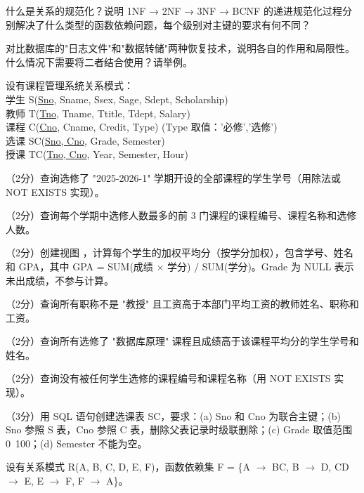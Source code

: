 \documentclass[a4paper,11pt]{article}
\begin{document}

\q 什么是关系的规范化？说明 1NF → 2NF → 3NF → BCNF 的递进规范化过程分别解决了什么类型的函数依赖问题，每个级别对主键的要求有何不同？
\anslines{3cm}

\q 对比数据库的"日志文件"和"数据转储"两种恢复技术，说明各自的作用和局限性。什么情况下需要将二者结合使用？请举例。
\anslines{3cm}


设有课程管理系统关系模式：\\
学生 S(\underline{Sno}, Sname, Ssex, Sage, Sdept, Scholarship)\\
教师 T(\underline{Tno}, Tname, Ttitle, Tdept, Salary)\\
课程 C(\underline{Cno}, Cname, Credit, Type)  \hfill (Type 取值：'必修','选修')\\
选课 SC(\underline{Sno, Cno}, Grade, Semester)\\
授课 TC(\underline{Tno, Cno}, Year, Semester, Hour)

\q （2分）查询选修了 "2025-2026-1" 学期开设的全部课程的学生学号（用除法或 NOT EXISTS 实现）。
\anslines{1cm}

\q （2分）查询每个学期中选修人数最多的前 3 门课程的课程编号、课程名称和选修人数。
\anslines{1.2cm}

\q （2分）创建视图 ，计算每个学生的加权平均分（按学分加权），包含学号、姓名和 GPA，其中 GPA = SUM(成绩 $\times$ 学分) / SUM(学分)。Grade 为 NULL 表示未出成绩，不参与计算。
\anslines{1.5cm}

\q （2分）查询所有职称不是 "教授" 且工资高于本部门平均工资的教师姓名、职称和工资。
\anslines{1.2cm}

\q （2分）查询所有选修了 "数据库原理" 课程且成绩高于该课程平均分的学生学号和姓名。
\anslines{1.2cm}

\q （2分）查询没有被任何学生选修的课程编号和课程名称（用 NOT EXISTS 实现）。
\anslines{1cm}

\q （3分）用 SQL 语句创建选课表 SC，要求：(a) Sno 和 Cno 为联合主键；(b) Sno 参照 S 表，Cno 参照 C 表，删除父表记录时级联删除；(c) Grade 取值范围 0~100；(d) Semester 不能为空。
\anslines{1.5cm}


\q 设有关系模式 R(A, B, C, D, E, F)，函数依赖集 F = \{A $\rightarrow$ BC, B $\rightarrow$ D, CD $\rightarrow$ E, E $\rightarrow$ F, F $\rightarrow$ A\}。
\end{document}
